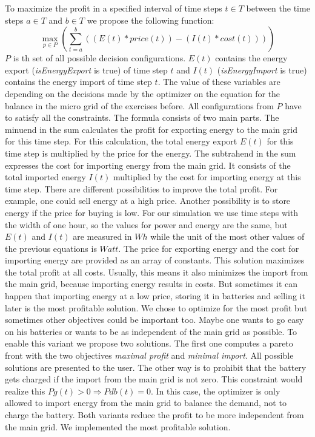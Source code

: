 To maximize the profit in a specified interval of time steps $t \in T$ between the time steps $a \in T$ and $b \in T$ we propose the following function:
\begin{equation} \label{eq:opt}
\max_{p \in P}{(\sum_{t=a}^{b}{((E(t)*price(t))-(I(t)*cost(t)))})}
\end{equation}
$P$ is th set of all possible decision configurations.
$E(t)$ contains the energy export (\textit{isEnergyExport} is true) of time step $t$ and $I(t)$ (\textit{isEnergyImport} is true) contains the energy import of time step $t$.
The value of these variables are depending on the decisions made by the optimizer on the equation for the balance in the micro grid of the exercises before. 
All configurations from $P$ have to satisfy all the constraints. 
The formula consists of two main parts. 
The minuend in the sum calculates the profit for exporting energy to the main grid for this time step. 
For this calculation, the total energy export $E(t)$ for this time step is multiplied by the price for the energy. 
The subtrahend in the sum expresses the cost for importing energy from the main grid. 
It consists of the total imported energy $I(t)$ multiplied by the cost for importing energy at this time step. 
There are different possibilities to improve the total profit. 
For example, one could sell energy at a high price. 
Another possibility is to store energy if the price for buying is low. 
For our simulation we use time steps with the width of one hour, so the values for power and energy are the same, but $E(t)$ and $I(t)$ are measured in $Wh$ while the unit of the most other values of the previous equations is $Watt$. The price for exporting energy and the cost for importing energy are provided as an array of constants.
This solution maximizes the total profit at all costs. Usually, this means it also minimizes the import from the main grid, because importing energy results in costs. But sometimes it can happen that importing energy at a low price, storing it in batteries and selling it later is the most profitable solution. We chose to optimize for the most profit but sometimes other objectives could be important too. Maybe one wants to go easy on his batteries or wants to be as independent of the main grid as possible. To enable this variant we propose two solutions. The first one computes a pareto front with the two objectives \textit{maximal profit} and \textit{minimal import}. All possible solutions are presented to the user.
The other way is to prohibit that the battery gets charged if the import from the main grid is not zero. This constraint would realize this $Pg(t) > 0 \Rightarrow Pdb(t) = 0$.
In this case, the optimizer is only allowed to import energy from the main grid to balance the demand, not to charge the battery.
Both variants reduce the profit to be more independent from the main grid. We implemented the most profitable solution.


